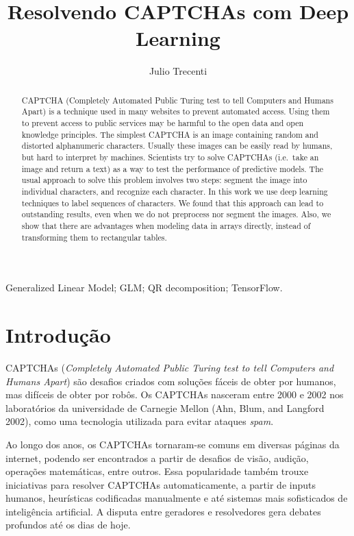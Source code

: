 \documentclass[]{elsarticle} %
\begin{document}
\begin{frontmatter}

  \title{Resolvendo CAPTCHAs com Deep Learning}
    \author[Instituto de Matemática e Estatística, Universidade de São Paulo]{Julio Trecenti}
  
      \address[Some Institute of Technology]{Instituto de Matemática e Estatística, Universidade de São Paulo}
  
  \begin{abstract}
  CAPTCHA (Completely Automated Public Turing test to tell Computers and Humans Apart) is a technique used in many websites to prevent automated access. Using them to prevent access to public services may be harmful to the open data and open knowledge principles. The simplest CAPTCHA is an image containing random and distorted alphanumeric characters. Usually these images can be easily read by humans, but hard to interpret by machines. Scientists try to solve CAPTCHAs (i.e.~take an image and return a text) as a way to test the performance of predictive models. The usual approach to solve this problem involves two steps: segment the image into individual characters, and recognize each character. In this work we use deep learning techniques to label sequences of characters. We found that this approach can lead to outstanding results, even when we do not preprocess nor segment the images. Also, we show that there are advantages when modeling data in arrays directly, instead of transforming them to rectangular tables.
  \end{abstract}
   \begin{keyword} Generalized Linear Model; GLM; QR decomposition; TensorFlow.\end{keyword}
 \end{frontmatter}

\hypertarget{introducao}{%
\section{Introdução}\label{introducao}}

CAPTCHAs (\emph{Completely Automated Public Turing test to tell Computers and Humans Apart}) são desafios criados com soluções fáceis de obter por humanos, mas difíceis de obter por robôs. Os CAPTCHAs nasceram entre 2000 e 2002 nos laboratórios da universidade de Carnegie Mellon (Ahn, Blum, and Langford 2002), como uma tecnologia utilizada para evitar ataques \emph{spam}.

Ao longo dos anos, os CAPTCHAs tornaram-se comuns em diversas páginas da internet, podendo ser encontrados a partir de desafios de visão, audição, operações matemáticas, entre outros. Essa popularidade também trouxe iniciativas para resolver CAPTCHAs automaticamente, a partir de inputs humanos, heurísticas codificadas manualmente e até sistemas mais sofisticados de inteligência artificial. A disputa entre geradores e resolvedores gera debates profundos até os dias de hoje.
\end{document}
